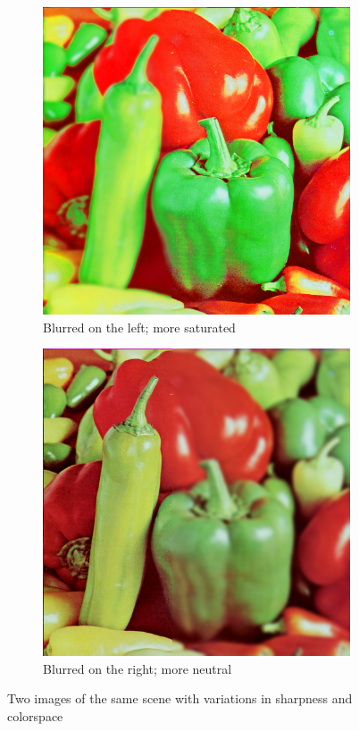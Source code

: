 \documentclass{article}
\begin{document}
\begin{figure}[h]
	\centering
	\begin{subfigure}[b]{0.45\textwidth}
		\centering
		\includegraphics[width=\textwidth]{figures/peppers/peppers_blur_left}
		\caption{Blurred on the left; more saturated}
	\end{subfigure}
	\begin{subfigure}[b]{0.45\textwidth}
		\centering
		\includegraphics[width=\textwidth]{figures/peppers/peppers_blur_right}
		\caption{Blurred on the right; more neutral}
	\end{subfigure}
	\caption{Two images of the same scene with variations in sharpness and colorspace}
	\label{fig_peppers_lr}
\end{figure}
\end{document}
